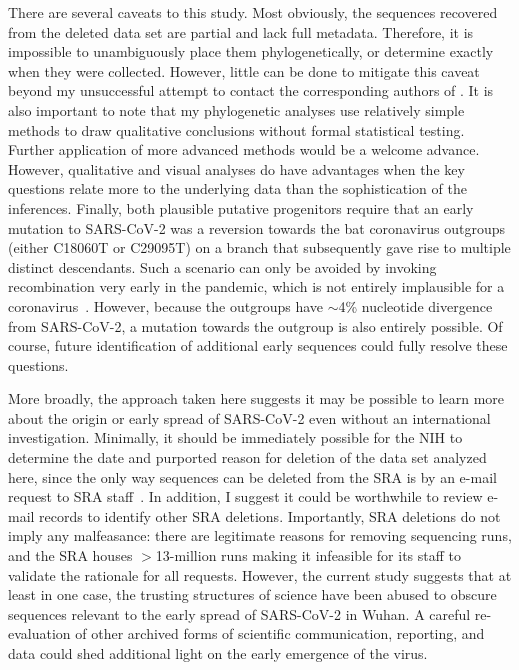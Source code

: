 \documentclass[9pt,twocolumn,twoside]{gsajnl_modified}
\begin{document}
There are several caveats to this study.
Most obviously, the sequences recovered from the deleted data set are partial and lack full metadata.
Therefore, it is impossible to unambiguously place them phylogenetically, or determine exactly when they were collected.
However, little can be done to mitigate this caveat beyond my unsuccessful attempt to contact the corresponding authors of \citet{wang2020medRxiv}.
It is also important to note that my phylogenetic analyses use relatively simple methods to draw qualitative conclusions without formal statistical testing.
Further application of more advanced methods would be a welcome advance.
However, qualitative and visual analyses do have advantages when the key questions relate more to the underlying data than the sophistication of the inferences.
Finally, both plausible putative progenitors require that an early mutation to SARS-CoV-2 was a reversion towards the bat coronavirus outgroups (either C18060T or C29095T) on a branch that subsequently gave rise to multiple distinct descendants.
Such a scenario can only be avoided by invoking recombination very early in the pandemic, which is not entirely implausible for a coronavirus~\citep{boni2020evolutionary}.
However, because the outgroups have $\sim$4\% nucleotide divergence from SARS-CoV-2, a mutation towards the outgroup is also entirely possible.
Of course, future identification of additional early sequences could fully resolve these questions.

More broadly, the approach taken here suggests it may be possible to learn more about the origin or early spread of SARS-CoV-2 even without an international investigation.
Minimally, it should be immediately possible for the NIH to determine the date and purported reason for deletion of the data set analyzed here, since the only way sequences can be deleted from the SRA is by an e-mail request to SRA staff~\citep{SRA_deletion}.
In addition, I suggest it could be worthwhile to review e-mail records to identify other SRA deletions.
Importantly, SRA deletions do not imply any malfeasance: there are legitimate reasons for removing sequencing runs, and the SRA houses $>$13-million runs making it infeasible for its staff to validate the rationale for all requests.
However, the current study suggests that at least in one case, the trusting structures of science have been abused to obscure sequences relevant to the early spread of SARS-CoV-2 in Wuhan.
A careful re-evaluation of other archived forms of scientific communication, reporting, and data could shed additional light on the early emergence of the virus.
\end{document}
